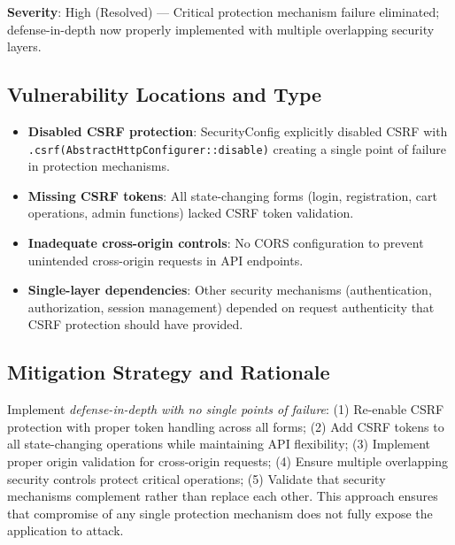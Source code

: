\documentclass[]{UCD_CS_FYP_Report}
\begin{document}
\textbf{Severity}: High (Resolved) — Critical protection mechanism failure eliminated; defense-in-depth now properly implemented with multiple overlapping security layers.

\subsection*{Vulnerability Locations and Type}
\begin{itemize}
	\item \textbf{Disabled CSRF protection}: SecurityConfig explicitly disabled CSRF with \texttt{.csrf(AbstractHttpConfigurer::disable)} creating a single point of failure in protection mechanisms.
	\item \textbf{Missing CSRF tokens}: All state-changing forms (login, registration, cart operations, admin functions) lacked CSRF token validation.
	\item \textbf{Inadequate cross-origin controls}: No CORS configuration to prevent unintended cross-origin requests in API endpoints.
	\item \textbf{Single-layer dependencies}: Other security mechanisms (authentication, authorization, session management) depended on request authenticity that CSRF protection should have provided.
\end{itemize}

\subsection*{Mitigation Strategy and Rationale}
Implement \textit{defense-in-depth with no single points of failure}: (1) Re-enable CSRF protection with proper token handling across all forms; (2) Add CSRF tokens to all state-changing operations while maintaining API flexibility; (3) Implement proper origin validation for cross-origin requests; (4) Ensure multiple overlapping security controls protect critical operations; (5) Validate that security mechanisms complement rather than replace each other. This approach ensures that compromise of any single protection mechanism does not fully expose the application to attack.
\end{document}
